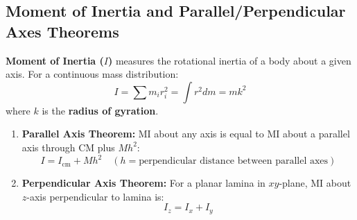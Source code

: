 \documentclass[12pt,a4paper]{article}
\begin{document}
\subsection{Moment of Inertia and Parallel/Perpendicular Axes Theorems}

\begin{tcolorbox}[defbox, title={\textbf{Definition: Moment of Inertia}}]
\textbf{Moment of Inertia ($I$)} measures the rotational inertia of a body about a given axis. For a continuous mass distribution:
\begin{equation}
I = \sum m_i r_i^2 = \int r^2 dm = m k^2
\end{equation}
where $k$ is the \textbf{radius of gyration}.
\end{tcolorbox}

\begin{tcolorbox}[formulabox, title={\textbf{Fundamental Theorems of Moment of Inertia}}]
\begin{enumerate}[leftmargin=*, itemsep=4pt]
  \item \textbf{Parallel Axis Theorem:} MI about any axis is equal to MI about a parallel axis through CM plus $M h^2$:
  \begin{equation}
  I = I_{\text{cm}} + M h^2 \quad (h = \text{perpendicular distance between parallel axes})
  \end{equation}
  \item \textbf{Perpendicular Axis Theorem:} For a planar lamina in $xy$-plane, MI about $z$-axis perpendicular to lamina is:
  \begin{equation}
  I_z = I_x + I_y
  \end{equation}
\end{enumerate}
\end{tcolorbox}
\end{document}
